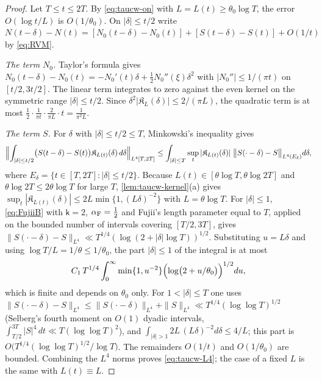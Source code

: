 \documentclass[11pt,a4paper]{article}
\numberwithin{equation}{section}
\theoremstyle{definition}
\theoremstyle{remark}
\begin{document}
\begin{proof}
Let $T\le t\le2T$. By \eqref{eq:taucw-on} with $L=L(t)\ge\theta_0\log T$, the error $O(\log t/L)$ is $O(1/\theta_0)$. On $|\delta|\le t/2$ write $N(t-\delta)-N(t)=[N_0(t-\delta)-N_0(t)]+[S(t-\delta)-S(t)]+O(1/t)$ by \eqref{eq:RVM}.

\emph{The term $N_0$.} Taylor's formula gives $N_0(t-\delta)-N_0(t)=-N_0'(t)\delta+\tfrac12N_0''(\xi)\delta^2$ with $|N_0''|\le1/(\pi t)$ on $[t/2,3t/2]$. The linear term integrates to zero against the even kernel on the symmetric range $|\delta|\le t/2$. Since $\delta^2|\mathfrak K_L(\delta)|\le2/(\pi L)$, the quadratic term is at most $\frac12\cdot\frac1{\pi t}\cdot\frac2{\pi L}\cdot t=\frac1{\pi^2L}$.

\emph{The term $S$.} For $\delta$ with $|\delta|\le t/2\le T$, Minkowski's inequality gives
\begin{equation}\label{eq:taucw-mink}
\Bigl\|\int_{|\delta|\le t/2}\bigl(S(t-\delta)-S(t)\bigr)\mathfrak K_{L(t)}(\delta)\,d\delta\Bigr\|_{L^4[T,2T]}\le\int_{|\delta|\le T}\sup_t|\mathfrak K_{L(t)}(\delta)|\;\bigl\|S(\cdot-\delta)-S\bigr\|_{L^4(E_\delta)}d\delta,
\end{equation}
where $E_\delta=\{t\in[T,2T]:|\delta|\le t/2\}$. Because $L(t)\in[\theta\log T,\theta\log 2T]$ and $\theta\log2T\le2\theta\log T$ for large $T$, \cref{lem:taucw-kernel}(a) gives $\sup_t|\mathfrak K_{L(t)}(\delta)|\le2L\min\{1,(L\delta)^{-2}\}$ with $L=\theta\log T$. For $|\delta|\le1$, \eqref{eq:FujiiB} with $\mathsf k=2$, $\alpha_{\rm F}=\tfrac12$ and Fujii's length parameter equal to $T$, applied on the bounded number of intervals covering $[T/2,3T]$, gives $\|S(\cdot-\delta)-S\|_{L^4}\ll T^{1/4}(\log(2+|\delta|\log T))^{1/2}$. Substituting $u=L\delta$ and using $\log T/L=1/\theta\le1/\theta_0$, the part $|\delta|\le1$ of the integral is at most
\begin{equation}\label{eq:taucw-fujii}
C_1\,T^{1/4}\int_0^\infty\min\{1,u^{-2}\}\Bigl(\log\bigl(2+u/\theta_0\bigr)\Bigr)^{1/2}du,
\end{equation}
which is finite and depends on $\theta_0$ only. For $1<|\delta|\le T$ one uses $\|S(\cdot-\delta)-S\|_{L^4}\le\|S(\cdot-\delta)\|_{L^4}+\|S\|_{L^4}\ll T^{1/4}(\log\log T)^{1/2}$ (Selberg's fourth moment on $O(1)$ dyadic intervals, $\int_{T/2}^{3T}|S|^4\,dt\ll T(\log\log T)^2$), and $\int_{|\delta|>1}2L\,(L\delta)^{-2}d\delta\le4/L$; this part is $O\bigl(T^{1/4}(\log\log T)^{1/2}/\log T\bigr)$. The remainders $O(1/t)$ and $O(1/\theta_0)$ are bounded. Combining the $L^4$ norms proves \eqref{eq:taucw-L4}; the case of a fixed $L$ is the same with $L(t)\equiv L$.
\end{proof}
\end{document}

